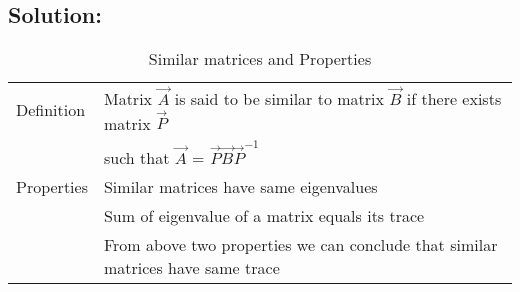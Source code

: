 \documentclass[journal,12pt,twocolumn]{IEEEtran}
\begin{document}
\subsection*{\textbf{Solution:}}
\begin{table}[h!]
\begin{center}
\begin{tabular}{|m{2cm}|m{6cm}|}\hline
        Definition & Matrix $\vec{A}$ is said to be similar to matrix $\vec{B}$ if there exists matrix $\vec{P}$\\& such that $\vec{A}$ = $\vec{P}\vec{B}\vec{P}^{-1}$\\
        \hline
        Properties& Similar matrices have same eigenvalues\\&
        Sum of eigenvalue of a matrix equals its trace\\&
        From above two properties we can conclude that similar matrices have same trace\\
        \hline
\end{tabular}
\end{center}
\caption{Similar matrices and Properties}
\label{tab:my_label}
\end{table}
\end{document}
